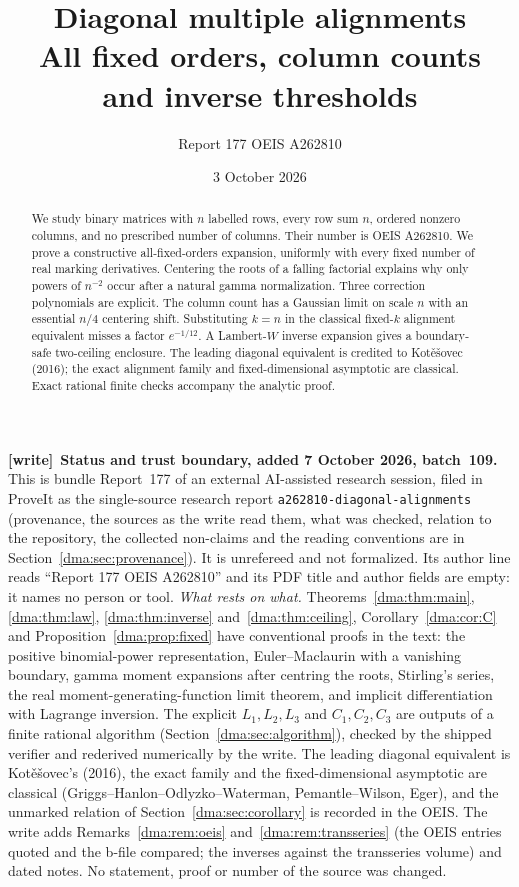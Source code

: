 \documentclass[11pt,letterpaper]{article}
\title{Diagonal multiple alignments\\\large All fixed orders, column counts and inverse thresholds}
\author{Report 177 \quad OEIS A262810}
\date{3 October 2026}
\theoremstyle{remark}\newtheorem{remark}[theorem]{Remark}
\newcommand{\file}[1]{\nolinkurl{#1}}
\newenvironment{writenote}[1][]{\par\smallskip\begingroup\small
 \noindent\textbf{[write]}\if\relax\detokenize{#1}\relax\else~\textbf{#1.}\fi\ }%
 {\par\endgroup\smallskip}
\begin{document}
\maketitle
\begin{abstract}
We study binary matrices with $n$ labelled rows, every row sum $n$, ordered nonzero columns, and no prescribed number of columns. Their number is OEIS A262810. We prove a constructive all-fixed-orders expansion, uniformly with every fixed number of real marking derivatives. Centering the roots of a falling factorial explains why only powers of $n^{-2}$ occur after a natural gamma normalization. Three correction polynomials are explicit. The column count has a Gaussian limit on scale $n$ with an essential $n/4$ centering shift. Substituting $k=n$ in the classical fixed-$k$ alignment equivalent misses a factor $e^{-1/12}$. A Lambert-$W$ inverse expansion gives a boundary-safe two-ceiling enclosure. The leading diagonal equivalent is credited to Kot\v{e}\v{s}ovec (2016); the exact alignment family and fixed-dimensional asymptotic are classical. Exact rational finite checks accompany the analytic proof.
\end{abstract}
\begin{writenote}[Status and trust boundary, added 7 October 2026, batch~109]
This is bundle Report~177 of an external AI-assisted research session, filed
in ProveIt as the single-source research report
\file{a262810-diagonal-alignments} (provenance, the sources as the write read
them, what was checked, relation to the repository, the collected non-claims
and the reading conventions are in Section~\ref{dma:sec:provenance}). It is
unrefereed and not formalized. Its author line reads ``Report 177 \quad OEIS
A262810'' and its PDF title and author fields are empty: it names no person
or tool. \emph{What rests on what.} Theorems~\ref{dma:thm:main},
\ref{dma:thm:law}, \ref{dma:thm:inverse} and~\ref{dma:thm:ceiling},
Corollary~\ref{dma:cor:C} and Proposition~\ref{dma:prop:fixed} have
conventional proofs in the text: the positive binomial-power
representation, Euler--Maclaurin with a vanishing boundary, gamma moment
expansions after centring the roots, Stirling's series, the real
moment-generating-function limit theorem, and implicit differentiation with
Lagrange inversion. The explicit $L_1,L_2,L_3$ and $C_1,C_2,C_3$ are outputs
of a finite rational algorithm (Section~\ref{dma:sec:algorithm}), checked by
the shipped verifier and rederived numerically by the write. The leading
diagonal equivalent is Kot\v{e}\v{s}ovec's (2016), the exact family and the
fixed-dimensional asymptotic are classical (Griggs--Hanlon--Odlyzko--Waterman,
Pemantle--Wilson, Eger), and the unmarked relation of
Section~\ref{dma:sec:corollary} is recorded in the OEIS. The write adds
Remarks~\ref{dma:rem:oeis} and~\ref{dma:rem:transseries} (the OEIS entries
quoted and the b-file compared; the inverses against the transseries volume)
and dated notes. No statement, proof or number of the source was changed.
\end{writenote}
\begingroup
\small
\setlength{\parskip}{0pt}
\tableofcontents
\endgroup
\clearpage
\end{document}
